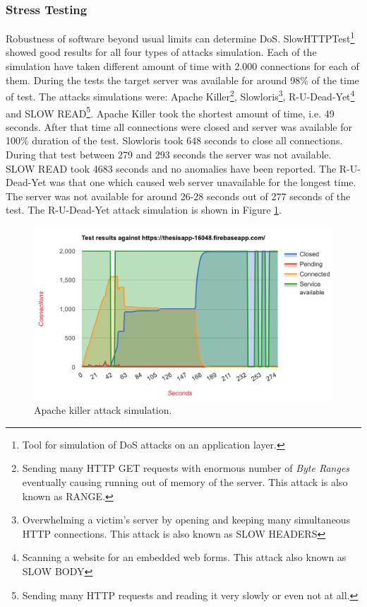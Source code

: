 \documentclass{article} %
\begin{document}
\subsubsection{Stress Testing}
Robustness of software beyond usual limits can determine DoS. SlowHTTPTest\footnote{Tool for simulation of DoS attacks on an application layer.} showed good results for all four types of attacks simulation. Each of the simulation have taken different amount of time with 2.000 connections for each of them. During the tests the target server was available for around 98\% of the time of test. The attacks simulations were: Apache Killer\footnote{Sending many HTTP GET requests with enormous number of \textit{Byte Ranges} eventually causing running out of memory of  the server. This attack is also known as RANGE.}, Slowloris\footnote{Overwhelming a victim's server by opening and keeping many simultaneous HTTP connections. This attack is also known as SLOW HEADERS}, R-U-Dead-Yet\footnote{Scanning a website for an embedded web forms. This attack also known as SLOW BODY} and SLOW READ\footnote{Sending many HTTP requests and reading it very slowly or even not at all.}. Apache Killer took the shortest amount of time, i.e. 49 seconds. After that time all connections were closed and server was available for 100\% duration of the test. Slowloris took 648 seconds to close all connections. During that test between 279 and 293 seconds the server was not available. SLOW READ took 4683 seconds and no anomalies have been reported. The R-U-Dead-Yet was that one which caused web server unavailable for the longest time. The server was not available for around 26-28 seconds out of 277 seconds of the test. The R-U-Dead-Yet attack simulation is shown in Figure \ref{fig:ru_dead_yet}.
\begin{figure}[ht]
  \centering
      \includegraphics[width=1\textwidth]{ru_dead_yet.png}
  \caption{Apache killer attack simulation.}
  \label{fig:ru_dead_yet}
\end{figure}
\end{document}
